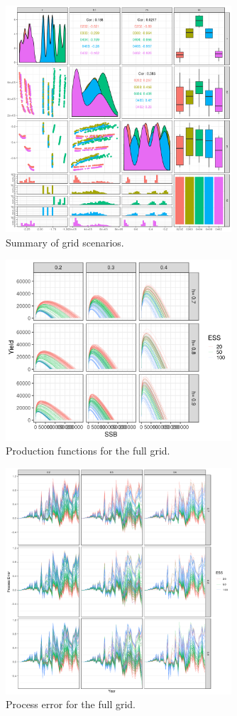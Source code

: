 \documentclass[a4paper]{article}
\begin{document}
\begin{figure}[ht!]
\centering
\includegraphics[width=0.75\textwidth]{alb-prior4-1.png}
\caption{\label{fig:grid} Summary of grid scenarios.}
\end{figure}

\begin{figure}[ht!]
\centering
\includegraphics[width=0.75\textwidth]{alb-pfunc-1.png}
\caption{\label{fig:pf} Production functions for the full grid.}
\end{figure}

\begin{figure}[ht!]
\centering
\includegraphics[width=0.75\textwidth]{alb-pe-1.png}
\caption{\label{fig:pe} Process error for the full grid.}
\end{figure}
\end{document}
